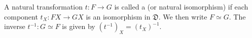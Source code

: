 A natural transformation $t: F \to G$ is called a  (or natural isomorphism) if each component $t_X: FX \to GX$ is an isomorphism in $\mathfrak{D}$. We then write $F \simeq G$. The inverse $t^{-1}: G \simeq F$ is given by $(t^{-1})_X = (t_X)^{-1}$.
